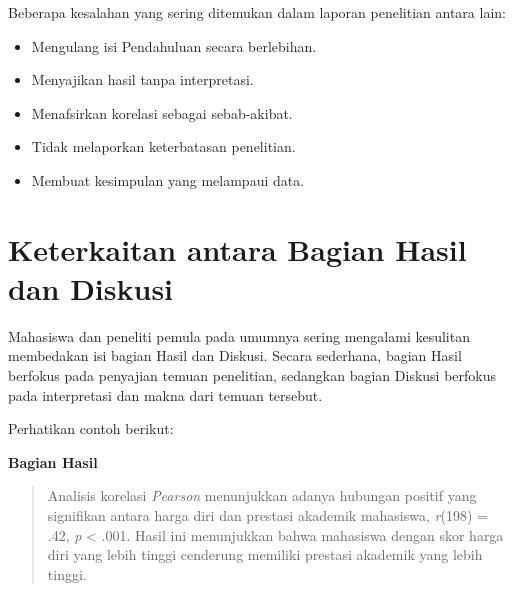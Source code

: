\documentclass[
  indonesian,
  letterpaper,
  DIV=11,
  numbers=noendperiod]{scrreprt}
\providecommand{\tightlist}{%
  \setlength{\itemsep}{0pt}\setlength{\parskip}{0pt}}
\begin{document}
\begin{tcolorbox}[enhanced jigsaw, colframe=quarto-callout-caution-color-frame, toptitle=1mm, breakable, leftrule=.75mm, arc=.35mm, toprule=.15mm, colback=white, colbacktitle=quarto-callout-caution-color!10!white, bottomtitle=1mm, bottomrule=.15mm, titlerule=0mm, title=\textcolor{quarto-callout-caution-color}{\faFire}\hspace{0.5em}{Kesalahan Umum dalam Penulisan Laporan Penelitian}, coltitle=black, left=2mm, opacitybacktitle=0.6, opacityback=0, rightrule=.15mm]

Beberapa kesalahan yang sering ditemukan dalam laporan penelitian antara
lain:

\begin{itemize}
\tightlist
\item
  Mengulang isi Pendahuluan secara berlebihan.
\item
  Menyajikan hasil tanpa interpretasi.
\item
  Menafsirkan korelasi sebagai sebab-akibat.
\item
  Tidak melaporkan keterbatasan penelitian.
\item
  Membuat kesimpulan yang melampaui data.
\end{itemize}

\end{tcolorbox}

\section{Keterkaitan antara Bagian Hasil dan
Diskusi}\label{keterkaitan-antara-bagian-hasil-dan-diskusi}

Mahasiswa dan peneliti pemula pada umumnya sering mengalami kesulitan
membedakan isi bagian Hasil dan Diskusi. Secara sederhana, bagian Hasil
berfokus pada penyajian temuan penelitian, sedangkan bagian Diskusi
berfokus pada interpretasi dan makna dari temuan tersebut.

Perhatikan contoh berikut:

\textbf{Bagian Hasil}

\begin{quote}
Analisis korelasi \emph{Pearson} menunjukkan adanya hubungan positif
yang signifikan antara harga diri dan prestasi akademik mahasiswa,
\emph{r}(198) = .42, \emph{p} \textless{} .001. Hasil ini menunjukkan
bahwa mahasiswa dengan skor harga diri yang lebih tinggi cenderung
memiliki prestasi akademik yang lebih tinggi.
\end{quote}
\end{document}
